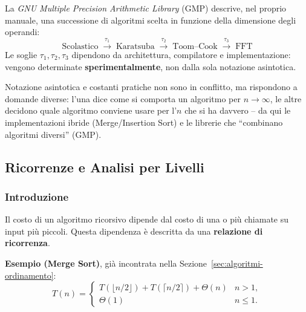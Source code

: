 \documentclass[12pt, a4paper]{article}
\begin{document}
\begin{tcolorbox}[colback=lightergray!10, colframe=tocsec, title=\textbf{GMP Combina Algoritmi Diversi}]
La \textit{GNU Multiple Precision Arithmetic Library} (GMP) descrive, nel proprio manuale, una successione di algoritmi scelta in funzione della dimensione degli operandi:
$$\text{Scolastico} \;\xrightarrow{\tau_1}\; \text{Karatsuba} \;\xrightarrow{\tau_2}\; \text{Toom--Cook} \;\xrightarrow{\tau_3}\; \text{FFT}$$
Le soglie $\tau_1,\tau_2,\tau_3$ dipendono da architettura, compilatore e implementazione: vengono determinate \textbf{sperimentalmente}, non dalla sola notazione asintotica.
\end{tcolorbox}

\begin{tcolorbox}[colback=lightergray!5, colframe=tocsubsec, title=\textbf{Filo Conduttore della Sezione}]
Notazione asintotica e costanti pratiche non sono in conflitto, ma rispondono a domande diverse: l'una dice come si comporta un algoritmo per $n\to\infty$, le altre decidono quale algoritmo conviene usare per l'$n$ che si ha davvero -- da qui le implementazioni ibride (Merge/Insertion Sort) e le librerie che ``combinano algoritmi diversi'' (GMP).
\end{tcolorbox}



\subsection{Ricorrenze e Analisi per Livelli}
\label{sec:ricorrenze-analisi-livelli}

\subsubsection{Introduzione}

\begin{tcolorbox}[colback=lightergray!10, colframe=tocsec, title=\textbf{Definizione: Relazione di Ricorrenza}]
\label{def:relazione-ricorrenza-formale}
Il costo di un algoritmo ricorsivo dipende dal costo di una o più chiamate su input più piccoli. Questa dipendenza è descritta da una \textbf{relazione di ricorrenza}.
\end{tcolorbox}

\textbf{Esempio (Merge Sort)}, già incontrata nella Sezione~\ref{sec:algoritmi-ordinamento}:
$$T(n) = \begin{cases} T(\lfloor n/2\rfloor) + T(\lceil n/2\rceil) + \Theta(n) & n>1, \\ \Theta(1) & n\le 1. \end{cases}$$
\end{document}
